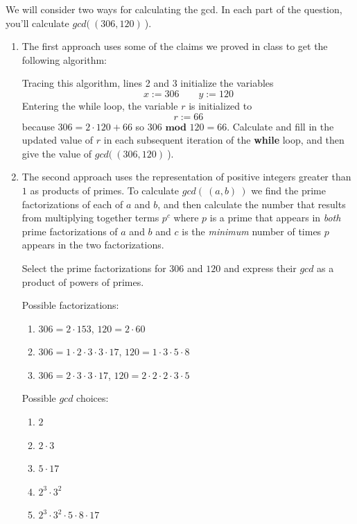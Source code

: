 
We will consider two ways for calculating the gcd. In each 
part of the question, you'll calculate $gcd(~(306, 120)~$).

\begin{enumerate}
\item The first approach uses some of the claims we proved in class
to get the following algorithm:


Tracing this algorithm, lines 2 and 3 initialize the variables 
\[
    x:= 306 \qquad y:=120
\]
Entering the while loop, the variable $r$ is initialized to
\[
    r:= 66
\]
because $306 = 2 \cdot 120 + 66$ so $306 \textbf{ mod } 120 = 66$.
Calculate and fill in the updated value of $r$ in each subsequent iteration
of the {\bf while} loop, and then give the value of $gcd(~(306, 120)~$).

\item The second approach uses the representation of positive integers
greater than $1$ as products of primes. To calculate $gcd(~(a,b)~)$ we 
find the prime factorizations of each of $a$ and $b$, and then calculate
the number that results from multiplying together terms $p^c$ where $p$ is 
a prime that appears in {\it both} prime factorizations of $a$ and $b$
and $c$ is the {\it minimum} number of times $p$ appears in the two factorizations.

Select the prime factorizations for $306$ and $120$ and express their 
$gcd$ as a product of powers of primes.

Possible factorizations:
\begin{enumerate}
        \item $306 = 2 \cdot 153$, $120 = 2 \cdot 60$
        \item $306 = 1 \cdot 2 \cdot 3 \cdot 3 \cdot 17$, $120 = 1 \cdot 3 \cdot 5 \cdot 8$
        \item $306 = 2 \cdot 3 \cdot 3 \cdot 17$, $120 = 2 \cdot 2 \cdot 2 \cdot 3 \cdot 5$
\end{enumerate}

Possible $gcd$ choices:
\begin{enumerate}
\item $2$
\item $2 \cdot 3$
\item $5 \cdot 17$
\item $2^3 \cdot 3^2$
\item $2^3 \cdot 3^2 \cdot 5 \cdot 8 \cdot 17$
\end{enumerate}
\end{enumerate}